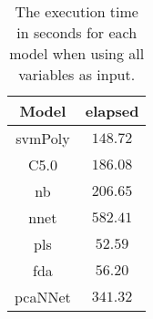 \begin{table}[!ht]
	\centering
	\begin{tabular}{|c|c|}
		\hline
		Model & elapsed \\ \hline
		svmPoly & $148.72$ \\ \hline
		C5.0 & $186.08$ \\ \hline
		nb & $206.65$ \\ \hline
		nnet & $582.41$ \\ \hline
		pls & $52.59$ \\ \hline
		fda & $56.20$ \\ \hline
		pcaNNet & $341.32$ \\ \hline
	\end{tabular}
	\caption{The execution time in seconds for each model when using all variables as input.}
	\label{tab:time:all:total}
\end{table}
